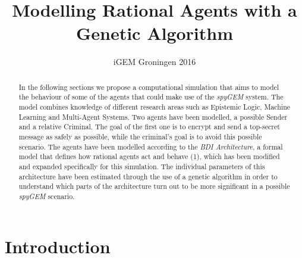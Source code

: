 \documentclass[a4paper]{article}
\begin{document}
\title {Modelling Rational Agents with a Genetic Algorithm}
\author{iGEM Groningen 2016}

\pagestyle{empty}
\maketitle


\thispagestyle{empty}
\begin{abstract}

In the following sections we propose a computational simulation that aims to model the behaviour of some of the agents that could make use of the \textit{spyGEM} system. The model combines knowledge of different research areas such as Epistemic Logic, Machine Learning and Multi-Agent Systems. Two agents have been modelled, a possible Sender and a relative Criminal. The goal of the first one is to encrypt and send a top-secret message as safely as possible, while the criminal's goal is to avoid this possible scenario. The agents have been modelled according to the \textit{BDI Architecture}, a formal model that defines how rational agents act and behave (1), which has been modified and expanded specifically for this simulation. The individual parameters of this architecture have been estimated through the use of a genetic algorithm in order to understand which parts of the architecture turn out to be more significant in a possible \textit{spyGEM} scenario.        

\end{abstract}

\section{Introduction}
\end{document}
